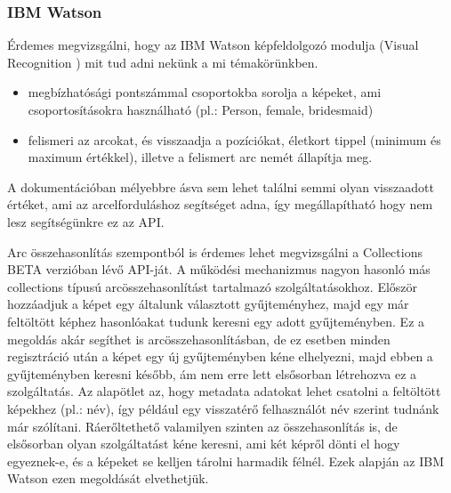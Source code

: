 \subsubsection{IBM Watson}
Érdemes megvizsgálni, hogy az IBM Watson képfeldolgozó modulja (Visual Recognition \cite{IBMWatson}) mit tud adni nekünk a mi témakörünkben. 
\begin{itemize}
\item megbízhatósági pontszámmal csoportokba sorolja a képeket, ami csoportosításokra használható (pl.: Person, female, bridesmaid)
\item felismeri az arcokat, és visszaadja a pozíciókat, életkort tippel (minimum és maximum értékkel), illetve a felismert arc nemét állapítja meg.
\end{itemize}

A dokumentációban \cite{WATSON_DETECT} mélyebbre ásva sem lehet találni semmi olyan visszaadott értéket, ami az arcelforduláshoz segítséget adna, így megállapítható hogy nem lesz segítségünkre ez az API.

Arc összehasonlítás szempontból is érdemes lehet megvizsgálni a Collections BETA\cite{WATSON_COLLECTIONS} verzióban lévő API-ját. A működési mechanizmus nagyon hasonló más collections típusú arcösszehasonlítást tartalmazó szolgáltatásokhoz. Először hozzáadjuk a képet egy általunk választott gyűjteményhez, majd egy már feltöltött képhez hasonlóakat tudunk keresni egy adott gyűjteményben. Ez a megoldás akár segíthet is arcösszehasonlításban, de ez esetben minden regisztráció után a képet egy új gyűjteményben kéne elhelyezni, majd ebben a gyűjteményben keresni később, ám nem erre lett elsősorban létrehozva ez a szolgáltatás. Az alapötlet az, hogy metadata adatokat lehet csatolni a feltöltött képekhez (pl.: név), így például egy visszatérő felhasználót név szerint tudnánk már szólítani. Ráerőltethető valamilyen szinten az összehasonlítás is, de elsősorban olyan szolgáltatást kéne keresni, ami két képről dönti el hogy egyeznek-e, és a képeket se kelljen tárolni harmadik félnél. Ezek alapján az IBM Watson ezen megoldását elvethetjük.

